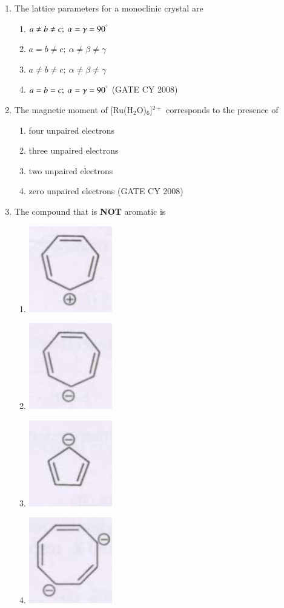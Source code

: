 \documentclass[12pt]{article}
\begin{document}
\begin{enumerate}
\item  The lattice parameters for a monoclinic crystal are
\begin{enumerate}
    \item  $a \neq b \neq c; \ \alpha = \gamma = 90^\degree$
    \item  $a = b \neq c; \ \alpha \neq \beta \neq \gamma$
    \item $a \neq b \neq c; \ \alpha \neq \beta \neq \gamma$\
    \item  $a = b = c; \ \alpha = \gamma = 90^\degree$    \hfill{(GATE CY 2008)}
\end{enumerate}
    



    \item The magnetic moment of [Ru(H$_2$O)$_6$]$^{2+}$
 corresponds to the presence of
    \begin{enumerate}
    \item  four unpaired electrons 
    \item  three unpaired electrons
    \item  two unpaired electrons 
    \item  zero unpaired electrons    \hfill{(GATE CY 2008)}
    \end{enumerate}

    

    \item  The compound that is \textbf{NOT} aromatic is
\begin{enumerate}
    \item \includegraphics[width=0.1\columnwidth]{figs/q7 a.png} 
    \item \includegraphics[width=0.1\columnwidth]{figs/q7 b.png} 
    \item \includegraphics[width=0.1\columnwidth]{figs/q7 c.png} 
    \item \includegraphics[width=0.1\columnwidth]{figs/q7 d.png} 
\end{enumerate}



\end{enumerate}
\end{document}
